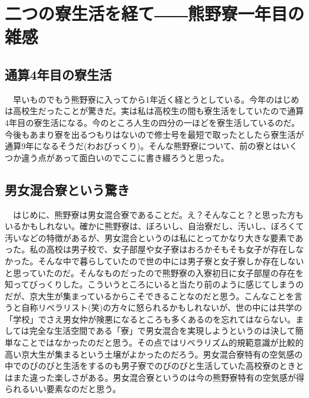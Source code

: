 \section{二つの寮生活を経て――熊野寮一年目の雑感}

\subsection{通算4年目の寮生活}
　早いものでもう熊野寮に入ってから1年近く経とうとしている。今年のはじめは高校生だったことが驚きだ。実は私は高校生の間も寮生活をしていたので通算4年目の寮生活になる。今のところ人生の四分の一ほどを寮生活しているのだ。今後もあまり寮を出るつもりはないので修士号を最短で取ったとしたら寮生活が通算9年になるそうだ(わおびっくり)。そんな熊野寮について、前の寮とはいくつか違う点があって面白いのでここに書き綴ろうと思った。

\subsection{男女混合寮という驚き}
　はじめに、熊野寮は男女混合寮であることだ。え？そんなこと？と思った方もいるかもしれない。確かに熊野寮は、ぼろいし、自治寮だし、汚いし、ぼろくて汚いなどの特徴があるが、男女混合というのは私にとってかなり大きな要素であった。私の高校は男子校で、女子部屋や女子寮はおろかそもそも女子が存在しなかった。そんな中で暮らしていたので世の中には男子寮と女子寮しか存在しないと思っていたのだ。そんなものだったので熊野寮の入寮初日に女子部屋の存在を知ってびっくりした。こういうところにいると当たり前のように感じてしまうのだが、京大生が集まっているからこそできることなのだと思う。こんなことを言うと自称リベラリスト(笑)の方々に怒られるかもしれないが、世の中には共学の「学校」でさえ男女仲が険悪になるところも多くあるのを忘れてはならない。ましては完全な生活空間である「寮」で男女混合を実現しようというのは決して簡単なことではなかったのだと思う。その点ではリベラリズム的規範意識が比較的高い京大生が集まるという土壌がよかったのだろう。男女混合寮特有の空気感の中でのびのびと生活をするのも男子寮でのびのびと生活していた高校寮のときとはまた違った楽しさがある。男女混合寮というのは今の熊野寮特有の空気感が得られるいい要素なのだと思う。


